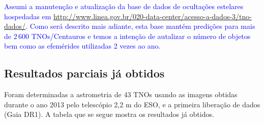 \documentclass[a4paper, 11pt]{article}
\begin{document}
\textcolor{blue}{Assumi a manuten\c c\~ao e atualiza\c c\~ao da base de dados de oculta\c c\~oes estelares hospedadas em \url{http://www.linea.gov.br/020-data-center/acesso-a-dados-3/tno-dados/}. Como ser\'a descrito mais adiante, esta base mant\'em predi\c c\~oes para mais de 2\,600 TNOs/Centauros e temos a inten\c c\~ao de autalizar o n\'umero de objetos bem como as efem\'erides utilizadas 2 vezes ao ano.}
\subsection{Resultados parciais já obtidos}

Foram determinadas a astrometria de 43 TNOs usando as imagens obtidas durante o ano 2013 pelo telescópio 2,2 m do ESO, e a primeira liberação de dados (Gaia DR1). A tabela que se segue mostra os resultados já obtidos.  
\end{document}
